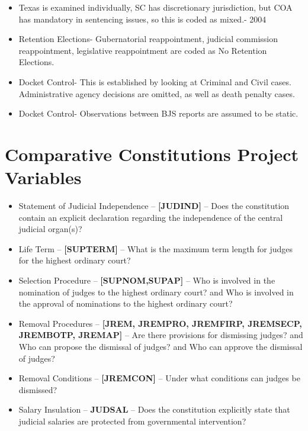 \documentclass[12pt]{article}
\begin{document}
\begin{itemize}
	\item Texas is examined individually, SC has discretionary jurisdiction, but COA has mandatory in sentencing issues, so this is coded as mixed.- 2004
	
	\item Retention Elections- Gubernatorial reappointment, judicial commission reappointment, legislative reappointment are coded as No Retention Elections.
	
	\item Docket Control- This is established by looking at Criminal and Civil cases.  Administrative agency decisions are omitted, as well as death penalty cases.
	
	\item Docket Control- Observations between BJS reports are assumed to be static.
\end{itemize}

\section{Comparative Constitutions Project Variables}\label{CCPCode}
\begin{itemize}
	\item Statement of Judicial Independence -- \textbf{[JUDIND]} -- Does the constitution contain an explicit declaration regarding the independence of the central judicial organ(s)? 
	\item Life Term -- \textbf{[SUPTERM]} -- What is the maximum term length for judges for the highest ordinary court? 
	\item Selection Procedure -- \textbf{[SUPNOM,SUPAP]} -- Who is involved in the nomination of judges to the highest ordinary court? and Who is involved in the approval of nominations to the highest ordinary court? 
	\item Removal Procedures -- \textbf{[JREM, JREMPRO, JREMFIRP, JREMSECP, JREMBOTP, JREMAP]} -- Are there provisions for dismissing judges? and Who can propose the dismissal of judges? and Who can approve the dismissal of judges?
	\item Removal Conditions -- \textbf{[JREMCON]} -- Under what conditions can judges be dismissed?
	\item Salary Insulation -- \textbf{JUDSAL} -- Does the constitution explicitly state that judicial salaries are protected from governmental intervention?
\end{itemize}
\end{document}
